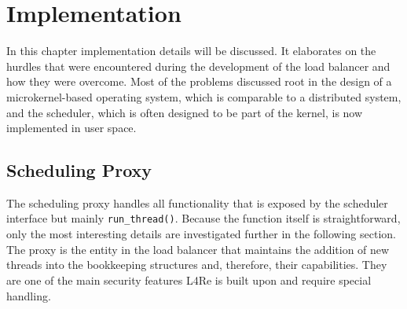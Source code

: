 \chapter{Implementation}
\label{sec:implementation}


In this chapter implementation details will be discussed.
It elaborates on the hurdles that were encountered during the development of the load balancer and how they were overcome.
Most of the problems discussed root in the design of a microkernel-based operating system, which is comparable to a distributed system, and the scheduler, which is often designed to be part of the kernel, is now implemented in user space.

\section{Scheduling Proxy}
\label{sec:impl:proxy}

The scheduling proxy handles all functionality that is exposed by the scheduler interface but mainly \texttt{run\_thread()}.
Because the function itself is straightforward, only the most interesting details are investigated further in the following section.
The proxy is the entity in the load balancer that maintains the addition of new threads into the bookkeeping structures and, therefore, their capabilities.
They are one of the main security features L4Re is built upon and require special handling.

